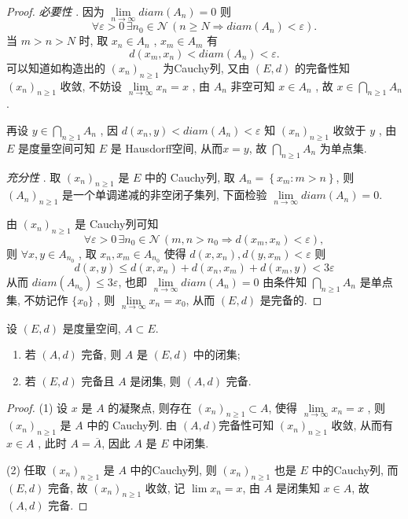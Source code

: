 \documentclass[lang=cn,10pt]{gorgeousnbook}
\numberwithin{equation}{section}%
\numberwithin{figure}{section}%
\begin{document}
\begin{proof}
\textsl{必要性} . 因为 $ \lim\limits_{n\to\infty}diam(A_{n})=0 $ 则
\[\forall \varepsilon>0\,\exists n_{0}\in\mathcal{N}\,(n\geqslant N\Rightarrow diam(A_{n})<\varepsilon).\]
当 $ m>n>N $ 时, 取 $ x_{n}\in A_{n} $ , $ x_{m}\in A_{m} $ 有
\[d(x_{m}, x_{n})<diam(A_{n})<\varepsilon. \]
可以知道如构造出的 $ (x_{n})_{n\geqslant1} $ 为Cauchy列, 又由 $ (E, d) $ 的完备性知 $ (x_{n})_{n\geqslant1} $ 收敛, 不妨设 $\lim\limits_{n\to\infty}x_{n}=x$ , 由 $ A_{n} $ 非空可知 $ x\in A_{n} $ , 故 $ x\in\bigcap\limits_{n\geqslant1}A_{n} $ .

再设 $ y\in\bigcap\limits_{n\geqslant1} A_{n} $ , 因 $ d(x_{n}, y)<diam(A_{n})<\varepsilon $ 知 $ (x_{n})_{n\geqslant1} $ 收敛于 $ y $ , 由 $ E $ 是度量空间可知 $ E $ 是 Hausdorff空间, 从而$ x=y $, 故 $ \bigcap\limits_{n\geqslant1} A_{n} $ 为单点集.

\textsl{充分性} . 取 $ (x_{n})_{n\geqslant1} $ 是 $ E $ 中的 Cauchy列, 取 $ A_{n}=\left\{ x_{m}:m>n \right\} $, 则 $ (A_{n})_{n\geqslant1} $ 是一个单调递减的非空闭子集列, 下面检验 $ \lim\limits_{n\to\infty} diam(A_{n})=0 $.

由 $ (x_{n})_{n\geqslant1} $ 是 Cauchy列可知
\[\forall \varepsilon>0\, \exists n_{0}\in\mathcal{N}\,(m, n>n_{0}\Rightarrow d(x_{m}, x_{n})<\varepsilon),\]
则 $ \forall x, y\in A_{n_{0}} $ , 取 $ x_{n}, x_{m}\in A_{n_{0}} $ 使得 $ d(x, x_{n}), d(y, x_{m})<\varepsilon $ 则
\[ d(x, y)\leqslant d(x, x_{n})+d(x_{n}, x_{m})+d(x_{m}, y) < 3\varepsilon \]
从而 $ diam(A_{n_{0}})\leqslant3\varepsilon $, 也即 $\lim\limits_{n\to\infty} diam(A_{n})=0 $
由条件知 $ \bigcap\limits_{n\geqslant1}A_{n} $ 是单点集, 不妨记作 $ \{ x_{0} \} $ , 则 $ \lim\limits_{n\to\infty}x_{n}=x_{0} $, 从而 $ (E, d) $  是完备的. 
\end{proof}
 
\begin{theorem}
设 $ (E, d) $ 是度量空间, $ A\subset E $.
\begin{enumerate}[(1)]
  \item 若 $ (A, d) $ 完备, 则 $ A $ 是 $ (E, d) $ 中的闭集;
  \item 若 $ (E, d) $ 完备且 $ A $ 是闭集, 则 $ (A, d) $ 完备.
\end{enumerate}
\end{theorem}

\begin{proof}
(1) 设 $ x $ 是 $ A $ 的凝聚点, 则存在 $ (x_{n})_{n\geqslant1}\subset A $, 使得 $ \lim\limits_{n\to\infty}x_{n}=x $ , 则 $ (x_{n})_{n\geqslant1} $ 是 $ A $ 中的 Cauchy列. 由 $ (A, d) $完备性可知 $ (x_{n})_{n\geqslant1} $ 收敛, 从而有 $ x\in A $ , 此时 $ A=\overline{A} $, 因此 $ A $ 是 $ E $ 中闭集.

(2) 任取 $ (x_{n})_{n\geqslant1} $ 是 $ A $ 中的Cauchy列, 则 $ (x_{n})_{n\geqslant1} $ 也是 $ E $ 中的Cauchy列, 而 $ (E, d) $ 完备, 故 $ (x_{n})_{n\geqslant1} $ 收敛, 记 $ \lim\limits x_{n}=x $, 由 $ A $ 是闭集知 $ x\in A $, 故 $ (A, d) $ 完备. 
\end{proof}
\end{document}
